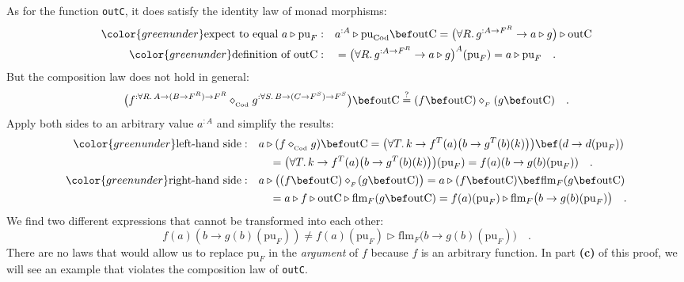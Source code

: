 As for the function \lstinline!outC!, it does satisfy the identity
law of monad morphisms:
\begin{align*}
{\color{greenunder}\text{expect to equal }a\triangleright\text{pu}_{F}:}\quad & a^{:A}\triangleright\text{pu}_{\text{Cod}}\bef\text{outC}=\big(\forall R.\,g^{:A\rightarrow F^{R}}\rightarrow a\triangleright g\big)\triangleright\text{outC}\\
{\color{greenunder}\text{definition of }\text{outC}:}\quad & =\big(\forall R.\,g^{:A\rightarrow F^{R}}\rightarrow a\triangleright g\big)^{A}(\text{pu}_{F})=a\triangleright\text{pu}_{F}\quad.
\end{align*}
But the composition law does not hold in general:
\[
\big(f^{:\forall R.\,A\rightarrow(B\rightarrow F^{R})\rightarrow F^{R}}\diamond_{_{\text{Cod}}}g^{:\forall S.\,B\rightarrow(C\rightarrow F^{S})\rightarrow F^{S}}\big)\bef\text{outC}\overset{?}{=}(f\bef\text{outC})\diamond_{_{F}}(g\bef\text{outC})\quad.
\]
Apply both sides to an arbitrary value $a^{:A}$ and simplify the
results:
\begin{align*}
{\color{greenunder}\text{left-hand side}:}\quad & a\triangleright(f\diamond_{_{\text{Cod}}}g)\bef\text{outC}=\big(\forall T.\,k\rightarrow f^{T}(a)\big(b\rightarrow g^{T}(b)(k)\big)\big)\bef(d\rightarrow d(\text{pu}_{F}))\\
 & \quad=\big(\forall T.\,k\rightarrow f^{T}(a)\big(b\rightarrow g^{T}(b)(k)\big)\big)(\text{pu}_{F})=f(a)(b\rightarrow g(b)(\text{pu}_{F}))\quad.\\
{\color{greenunder}\text{right-hand side}:}\quad & a\triangleright\big((f\bef\text{outC})\diamond_{_{F}}\!(g\bef\text{outC})\big)=a\triangleright(f\bef\text{outC})\bef\text{flm}_{F}(g\bef\text{outC})\\
 & \quad=a\triangleright f\triangleright\text{outC}\triangleright\text{flm}_{F}(g\bef\text{outC})=f(a)(\text{pu}_{F})\triangleright\text{flm}_{F}\big(b\rightarrow g(b)(\text{pu}_{F})\big)\quad.
\end{align*}
We find two different expressions that cannot be transformed into
each other:
\[
f(a)(b\rightarrow g(b)(\text{pu}_{F}))\neq f(a)(\text{pu}_{F})\triangleright\text{flm}_{F}\big(b\rightarrow g(b)(\text{pu}_{F})\big)\quad.
\]
There are no laws that would allow us to replace $\text{pu}_{F}$
in the \emph{argument} of $f$ because $f$ is an arbitrary function.
In part \textbf{(c)} of this proof, we will see an example that violates
the composition law of \lstinline!outC!.

